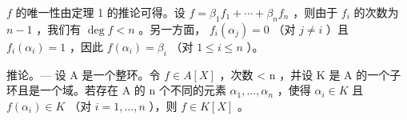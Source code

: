 \(f\) 的唯一性由定理 1 的推论可得。设 \(f = \beta_{1}f_{1} + \cdots + \beta_{n}f_{n}\) ，则由于 \(f_{i}\) 的次数为 \(n - 1\) ，我们有 \(\deg f < n\) 。另一方面， \(f_{i}(\alpha_{j}) = 0\) （对 \(j \neq i\) ）且 \(f_{i}(\alpha_{i}) = 1\) ，因此 \(f(\alpha_{i}) = \beta_{i}\) （对 \(1 \leqslant i \leqslant n\) ）。

推论。--- 设 A 是一个整环。令 \(f \in A[X]\) ，次数 \textless{} n ，并设 K 是 A 的一个子环且是一个域。若存在 A 的 n 个不同的元素 \(\alpha_{1}, \ldots, \alpha_{n}\) ，使得 \(\alpha_{i} \in K\) 且 \(f(\alpha_{i}) \in K\) （对 \(i = 1, \ldots, n\) ），则 \(f \in K[X]\) 。


